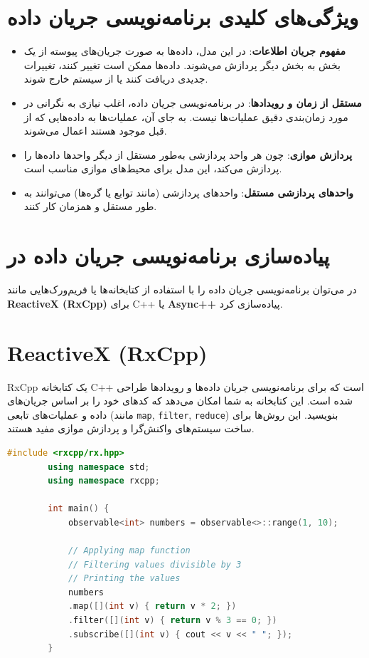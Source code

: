 \documentclass[12pt, a4paper]{report}
\begin{document}
\section{ویژگی‌های کلیدی برنامه‌نویسی جریان داده}
\begin{itemize}
	\item \textbf{مفهوم جریان اطلاعات}: در این مدل، داده‌ها به صورت جریان‌های پیوسته از یک بخش به بخش دیگر پردازش می‌شوند. داده‌ها ممکن است تغییر کنند، تغییرات جدیدی دریافت کنند یا از سیستم خارج شوند.
	\item \textbf{مستقل از زمان و رویدادها}: در برنامه‌نویسی جریان داده، اغلب نیازی به نگرانی در مورد زمان‌بندی دقیق عملیات‌ها نیست. به جای آن، عملیات‌ها به داده‌هایی که از قبل موجود هستند اعمال می‌شوند.
	\item \textbf{پردازش موازی}: چون هر واحد پردازشی به‌طور مستقل از دیگر واحدها داده‌ها را پردازش می‌کند، این مدل برای محیط‌های موازی مناسب است.
	\item \textbf{واحدهای پردازشی مستقل}: واحدهای پردازشی (مانند توابع یا گره‌ها) می‌توانند به طور مستقل و همزمان کار کنند.
\end{itemize}

\section{پیاده‌سازی برنامه‌نویسی جریان داده در }
در  می‌توان برنامه‌نویسی جریان داده را با استفاده از کتابخانه‌ها یا فریم‌ورک‌هایی مانند \textbf{ReactiveX (RxCpp)} برای C++ یا \textbf{Async++} پیاده‌سازی کرد.


\section{ReactiveX (RxCpp)}
RxCpp یک کتابخانه C++ است که برای برنامه‌نویسی جریان داده‌ها و رویدادها طراحی شده است. این کتابخانه به شما امکان می‌دهد که کدهای خود را بر اساس جریان‌های داده و عملیات‌های تابعی (مانند \texttt{map}, \texttt{filter}, \texttt{reduce}) بنویسید. این روش‌ها برای ساخت سیستم‌های واکنش‌گرا  و پردازش موازی مفید هستند.

\begin{LTR}
	\begin{lstlisting}[language=C++, breaklines=true]
		#include <rxcpp/rx.hpp>
		using namespace std;
		using namespace rxcpp;
		
		int main() {
			observable<int> numbers = observable<>::range(1, 10);
			
			// Applying map function
			// Filtering values divisible by 3
			// Printing the values
			numbers
			.map([](int v) { return v * 2; })  
			.filter([](int v) { return v % 3 == 0; })  
			.subscribe([](int v) { cout << v << " "; });  
		}
	\end{lstlisting}
\end{LTR}
\end{document}
